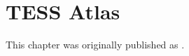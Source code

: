 \chapter[TESS Atlas]{TESS Atlas}
\label{ch.tess}

This chapter was originally published as \cite{}.


